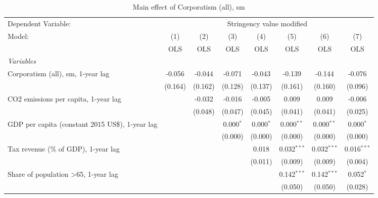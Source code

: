 
\begin{table}[htbp]
   \caption{Main effect of Corporatism (all), sm}
   \centering
   \begin{tabular}{lccccccc}
      \toprule
      Dependent Variable: & \multicolumn{7}{c}{Stringency value modified}\\
      Model:                                                & (1)     & (2)     & (3)         & (4)         & (5)           & (6)           & (7)\\  
                                                            &  OLS    & OLS     & OLS         & OLS         & OLS           & OLS           & OLS\\  
      \midrule
      \emph{Variables}\\
      Corporatism (all), sm, 1-year lag                     & -0.056  & -0.044  & -0.071      & -0.043      & -0.139        & -0.144        & -0.076\\   
                                                            & (0.164) & (0.162) & (0.128)     & (0.137)     & (0.161)       & (0.160)       & (0.096)\\   
      CO2 emissions per capita, 1-year lag                  &         & -0.032  & -0.016      & -0.005      & 0.009         & 0.009         & -0.006\\   
                                                            &         & (0.048) & (0.047)     & (0.045)     & (0.041)       & (0.041)       & (0.025)\\   
      GDP per capita (constant 2015 US\$), 1-year lag       &         &         & 0.000$^{*}$ & 0.000$^{*}$ & 0.000$^{**}$  & 0.000$^{**}$  & 0.000$^{*}$\\   
                                                            &         &         & (0.000)     & (0.000)     & (0.000)       & (0.000)       & (0.000)\\   
      Tax revenue (\% of GDP), 1-year lag                   &         &         &             & 0.018       & 0.032$^{***}$ & 0.032$^{***}$ & 0.016$^{***}$\\   
                                                            &         &         &             & (0.011)     & (0.009)       & (0.009)       & (0.004)\\   
      Share of population >65, 1-year lag                   &         &         &             &             & 0.142$^{***}$ & 0.142$^{***}$ & 0.052$^{*}$\\   
                                                            &         &         &             &             & (0.050)       & (0.050)       & (0.028)\\   

\end{tabular}
\end{table}
